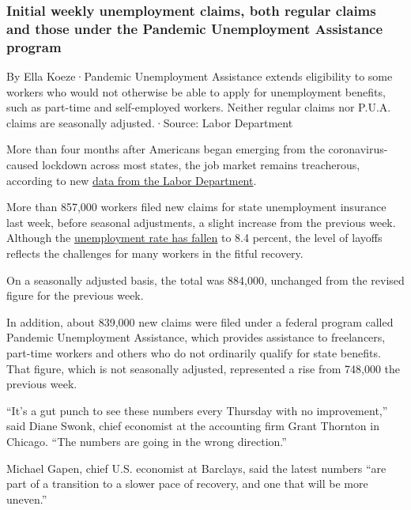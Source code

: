 \hypertarget{initial-weekly-unemployment-claims-both-regular-claims-and-those-under-the-pandemic-unemployment-assistance-program}{%
\subsubsection{Initial weekly unemployment claims, both regular claims
and those under the Pandemic Unemployment Assistance
program}\label{initial-weekly-unemployment-claims-both-regular-claims-and-those-under-the-pandemic-unemployment-assistance-program}}

By Ella Koeze·Pandemic Unemployment Assistance extends eligibility to
some workers who would not otherwise be able to apply for unemployment
benefits, such as part-time and self-employed workers. Neither regular
claims nor P.U.A. claims are seasonally adjusted.·Source: Labor
Department

More than four months after Americans began emerging from the
coronavirus-caused lockdown across most states, the job market remains
treacherous, according to new
\href{https://www.dol.gov/ui/data.pdf}{data from the Labor Department}.

More than 857,000 workers filed new claims for state unemployment
insurance last week, before seasonal adjustments, a slight increase from
the previous week. Although the
\href{https://www.nytimes3xbfgragh.onion/2020/09/04/business/economy/jobs-report.html}{unemployment
rate has fallen} to 8.4 percent, the level of layoffs reflects the
challenges for many workers in the fitful recovery.

On a seasonally adjusted basis, the total was 884,000, unchanged from
the revised figure for the previous week.

In addition, about 839,000 new claims were filed under a federal program
called Pandemic Unemployment Assistance, which provides assistance to
freelancers, part-time workers and others who do not ordinarily qualify
for state benefits. That figure, which is not seasonally adjusted,
represented a rise from 748,000 the previous week.

``It's a gut punch to see these numbers every Thursday with no
improvement,'' said Diane Swonk, chief economist at the accounting firm
Grant Thornton in Chicago. ``The numbers are going in the wrong
direction.''

Michael Gapen, chief U.S. economist at Barclays, said the latest numbers
``are part of a transition to a slower pace of recovery, and one that
will be more uneven.''

